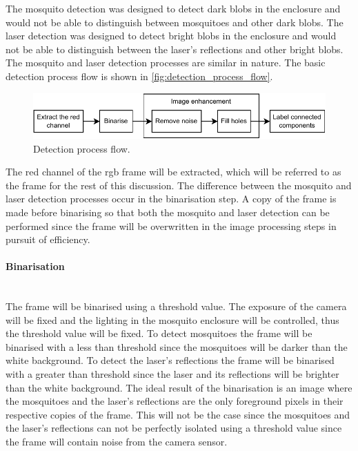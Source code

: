 The mosquito detection was designed to detect dark blobs in the enclosure and would not be able to distinguish between mosquitoes and other dark blobs. The laser detection was designed to detect bright blobs in the enclosure and would not be able to distinguish between the laser's reflections and other bright blobs. The mosquito and laser detection processes are similar in nature. The basic detection process flow is shown in \autoref{fig:detection_process_flow}.
\begin{figure}[h]
  \centering
  \includegraphics[width=\textwidth]{figures/detection/detection_process_flow.pdf}
  \caption{Detection process flow.}
  \label{fig:detection_process_flow}
\end{figure}
The red channel of the \gls{rgb} frame will be extracted, which will be referred to as the frame for the rest of this discussion. The difference between the mosquito and laser detection processes occur in the binarisation step. A copy of the frame is made before binarising so that both the mosquito and laser detection can be performed since the frame will be overwritten in the image processing steps in pursuit of efficiency.


\paragraph{Binarisation}\mbox{}\\
The frame will be binarised using a threshold value. The exposure of the camera will be fixed and the lighting in the mosquito enclosure will be controlled, thus the threshold value will be fixed. To detect mosquitoes the frame will be binarised with a less than threshold since the mosquitoes will be darker than the white background. To detect the laser's reflections the frame will be binarised with a greater than threshold since the laser and its reflections will be brighter than the white background. The ideal result of the binarisation is an image where the mosquitoes and the laser's reflections are the only foreground pixels in their respective copies of the frame. This will not be the case since the mosquitoes and the laser's reflections can not be perfectly isolated using a threshold value since the frame will contain noise from the camera sensor.


